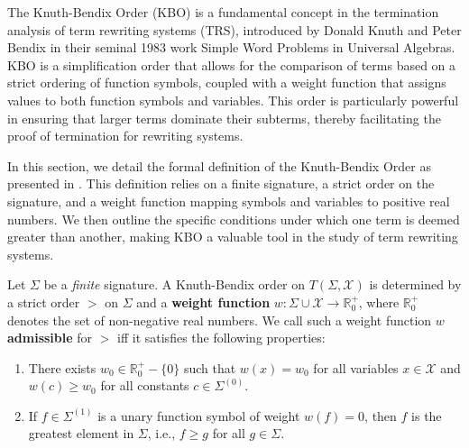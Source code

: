     The Knuth-Bendix Order (KBO) is a fundamental concept in the termination analysis of term rewriting systems (TRS), introduced by Donald Knuth and Peter Bendix in their seminal 1983 work Simple Word Problems in Universal Algebras. KBO is a simplification order that allows for the comparison of terms based on a strict ordering of function symbols, coupled with a weight function that assigns values to both function symbols and variables. This order is particularly powerful in ensuring that larger terms dominate their subterms, thereby facilitating the proof of termination for rewriting systems.

    In this section, we detail the formal definition of the Knuth-Bendix Order as presented in \cite{knuth1983simple}. This definition relies on a finite signature, a strict order on the signature, and a weight function mapping symbols and variables to positive real numbers. We then outline the specific conditions under which one term is deemed greater than another, making KBO a valuable tool in the study of term rewriting systems.
  
  \begin{definition}
    
    Let $\Sigma$ be a \textit{finite} signature. A Knuth-Bendix order on $T(\Sigma, \mathcal{X})$ is determined by a strict order $>$ on $\Sigma$ and a \textbf{weight function} $w : \Sigma \cup \mathcal{X} \rightarrow \mathbb{R}^+_0$, where $\mathbb{R}^+_0$ denotes the set of non-negative real numbers. We call such a weight function $w$ \textbf{admissible} for $>$ iff it satisfies the following properties:

\begin{enumerate}
    \item There exists $w_0 \in \mathbb{R}^+_0 - \{0\}$ such that $w(x) = w_0$ for all variables $x \in \mathcal{X}$ and $w(c) \geq w_0$ for all constants $c \in \Sigma^{(0)}$.
    \item If $f \in \Sigma^{(1)}$ is a unary function symbol of weight $w(f) = 0$, then $f$ is the greatest element in $\Sigma$, i.e., $f \geq g$ for all $g \in \Sigma$.
\end{enumerate}
\end{definition}

